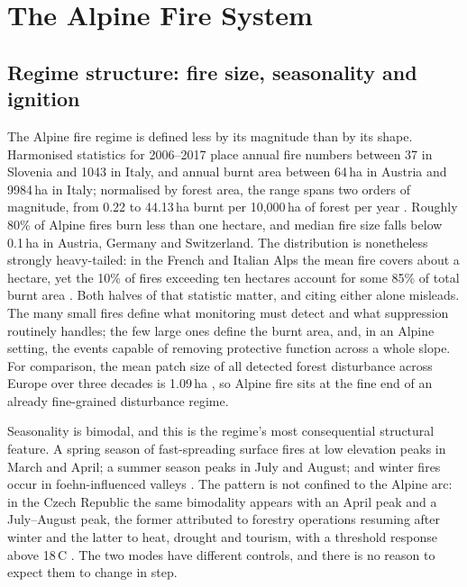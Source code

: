 \documentclass[11pt,a4paper]{article}
\begin{document}
\section{The Alpine Fire System}
\label{sec:system}

\subsection{Regime structure: fire size, seasonality and ignition}

The Alpine fire regime is defined less by its magnitude than by its shape. Harmonised statistics for 2006--2017 place annual fire numbers between 37 in Slovenia and 1043 in Italy, and annual burnt area between 64\,ha in Austria and 9984\,ha in Italy; normalised by forest area, the range spans two orders of magnitude, from 0.22 to 44.13\,ha burnt per 10{,}000\,ha of forest per year \citep{muller_forest_2020}. Roughly 80\% of Alpine fires burn less than one hectare, and median fire size falls below 0.1\,ha in Austria, Germany and Switzerland. The distribution is nonetheless strongly heavy-tailed: in the French and Italian Alps the mean fire covers about a hectare, yet the 10\% of fires exceeding ten hectares account for some 85\% of total burnt area \citep{muller_forest_2020}. Both halves of that statistic matter, and citing either alone misleads. The many small fires define what monitoring must detect and what suppression routinely handles; the few large ones define the burnt area, and, in an Alpine setting, the events capable of removing protective function across a whole slope. For comparison, the mean patch size of all detected forest disturbance across Europe over three decades is 1.09\,ha \citep{senf_mapping_2021}, so Alpine fire sits at the fine end of an already fine-grained disturbance regime.

Seasonality is bimodal, and this is the regime's most consequential structural feature. A spring season of fast-spreading surface fires at low elevation peaks in March and April; a summer season peaks in July and August; and winter fires occur in foehn-influenced valleys \citep{valese_wildfires_2011, muller_forest_2020}. The pattern is not confined to the Alpine arc: in the Czech Republic the same bimodality appears with an April peak and a July--August peak, the former attributed to forestry operations resuming after winter and the latter to heat, drought and tourism, with a threshold response above 18\,\degree C \citep{bercak_combination_2024}. The two modes have different controls, and there is no reason to expect them to change in step.
\end{document}
